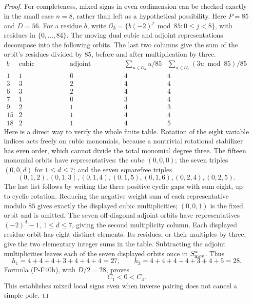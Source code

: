 \documentclass[11pt,a4paper]{article}
\begin{document}
\begin{proof}
For completeness, mixed signs in even codimension can be checked
exactly in the small case $n=8$, rather than left as a hypothetical
possibility. Here $P=85$ and $D=56$. For a residue $b$, write
$\mathcal O_b=\{b(-2)^j\bmod85:0\le j<8\}$, with residues in
$\{0,\ldots,84\}$. The moving dual cubic and adjoint representations
decompose into the following orbits. The last two columns give the
sum of the orbit's residues divided by $85$, before and after
multiplication by three.
\[
\begin{array}{c|rrrr}
 b&\text{cubic multiplicity}&\text{adjoint multiplicity}
       &\sum_{u\in\mathcal O_b}u/85
       &\sum_{u\in\mathcal O_b}(3u\bmod85)/85\\\hline
 1&1&0&4&4\\
 3&3&2&4&4\\
 6&3&2&4&4\\
 7&1&0&3&4\\
 9&2&1&4&3\\
15&2&1&4&4\\
18&2&1&4&5
\end{array}
\]
Here is a direct way to verify the whole finite table. Rotation
of the eight variable indices acts freely on cubic monomials,
because a nontrivial rotational stabilizer has even order,
which cannot divide the total monomial degree three.
The fifteen monomial orbits have representatives: the cube
$(0,0,0)$; the seven triples $(0,0,d)$ for $1\le d\le7$;
and the seven squarefree triples
\[
 (0,1,2),(0,1,3),(0,1,4),(0,1,5),(0,1,6),(0,2,4),(0,2,5).
\]
The last list follows by writing the three positive cyclic gaps
with sum eight, up to cyclic rotation. Reducing the negative
weight sum of each representative modulo $85$ gives exactly
the displayed cubic multiplicities; $(0,0,1)$ is the fixed
orbit and is omitted. The seven off-diagonal adjoint orbits
have representatives $(-2)^d-1$, $1\le d\le7$, giving the
second multiplicity column. Each displayed residue orbit has
eight distinct elements. Its residues, or their multiples by
three, give the two elementary integer sums in the table.
Subtracting the adjoint multiplicities leaves each of the seven
displayed orbits once in $S^*_{\rm mov}$. Thus
\[
 h_1=4+4+4+3+4+4+4=27,\qquad
 h_3=4+4+4+4+3+4+5=28.
\]
Formula (P-F40h), with $D/2=28$, proves
\[
                              C_1<0<C_3.
 \tag{P-F40k}
\]
This establishes mixed local signs even when inverse pairing
does not cancel a simple pole.
\end{proof}
\end{document}
